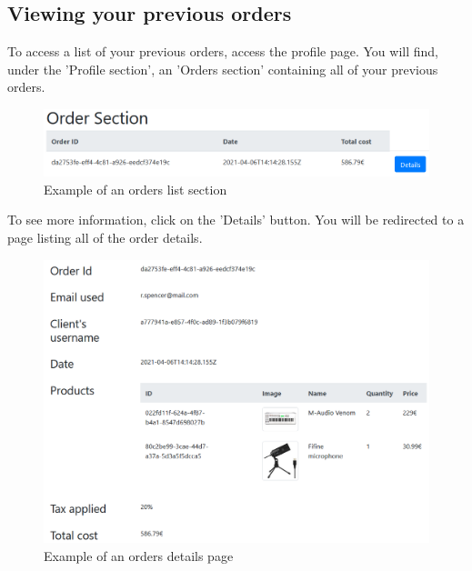 \subsection{Viewing your previous orders}
To access a list of your previous orders, access the profile page. You will find, under the 'Profile section', an 'Orders section' containing all of your previous orders.

\begin{figure}[H]
\centering
\includegraphics[scale=0.6]{res/Immagini/OrderSection}
\caption{Example of an orders list section}
\end{figure}

To see more information, click on the 'Details' button. You will be redirected to a page listing all of the order details.

\begin{figure}[H]
\centering
\includegraphics[scale=0.6]{res/Immagini/OrderDetails}
\caption{Example of an orders details page}
\end{figure}

